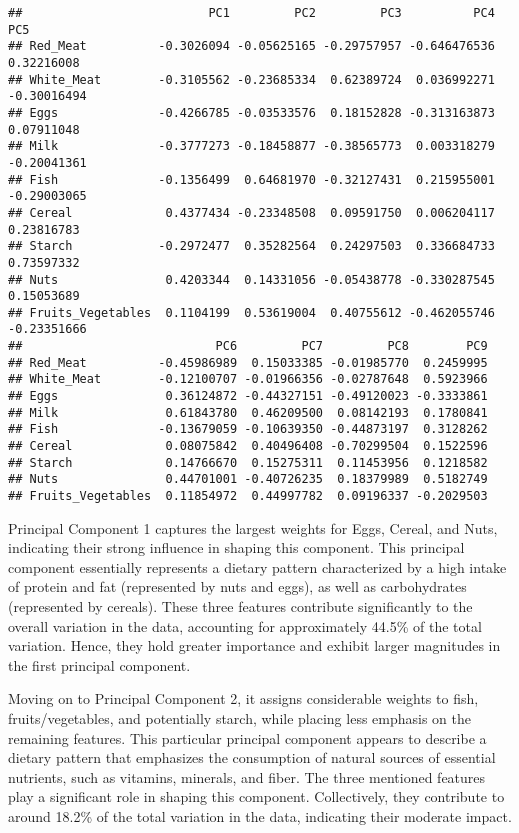 \documentclass[
]{article}
\begin{document}
\begin{verbatim}
##                          PC1         PC2         PC3          PC4         PC5
## Red_Meat          -0.3026094 -0.05625165 -0.29757957 -0.646476536  0.32216008
## White_Meat        -0.3105562 -0.23685334  0.62389724  0.036992271 -0.30016494
## Eggs              -0.4266785 -0.03533576  0.18152828 -0.313163873  0.07911048
## Milk              -0.3777273 -0.18458877 -0.38565773  0.003318279 -0.20041361
## Fish              -0.1356499  0.64681970 -0.32127431  0.215955001 -0.29003065
## Cereal             0.4377434 -0.23348508  0.09591750  0.006204117  0.23816783
## Starch            -0.2972477  0.35282564  0.24297503  0.336684733  0.73597332
## Nuts               0.4203344  0.14331056 -0.05438778 -0.330287545  0.15053689
## Fruits_Vegetables  0.1104199  0.53619004  0.40755612 -0.462055746 -0.23351666
##                           PC6         PC7         PC8        PC9
## Red_Meat          -0.45986989  0.15033385 -0.01985770  0.2459995
## White_Meat        -0.12100707 -0.01966356 -0.02787648  0.5923966
## Eggs               0.36124872 -0.44327151 -0.49120023 -0.3333861
## Milk               0.61843780  0.46209500  0.08142193  0.1780841
## Fish              -0.13679059 -0.10639350 -0.44873197  0.3128262
## Cereal             0.08075842  0.40496408 -0.70299504  0.1522596
## Starch             0.14766670  0.15275311  0.11453956  0.1218582
## Nuts               0.44701001 -0.40726235  0.18379989  0.5182749
## Fruits_Vegetables  0.11854972  0.44997782  0.09196337 -0.2029503
\end{verbatim}

Principal Component 1 captures the largest weights for Eggs, Cereal, and
Nuts, indicating their strong influence in shaping this component. This
principal component essentially represents a dietary pattern
characterized by a high intake of protein and fat (represented by nuts
and eggs), as well as carbohydrates (represented by cereals). These
three features contribute significantly to the overall variation in the
data, accounting for approximately 44.5\% of the total variation. Hence,
they hold greater importance and exhibit larger magnitudes in the first
principal component.

Moving on to Principal Component 2, it assigns considerable weights to
fish, fruits/vegetables, and potentially starch, while placing less
emphasis on the remaining features. This particular principal component
appears to describe a dietary pattern that emphasizes the consumption of
natural sources of essential nutrients, such as vitamins, minerals, and
fiber. The three mentioned features play a significant role in shaping
this component. Collectively, they contribute to around 18.2\% of the
total variation in the data, indicating their moderate impact.
\end{document}
